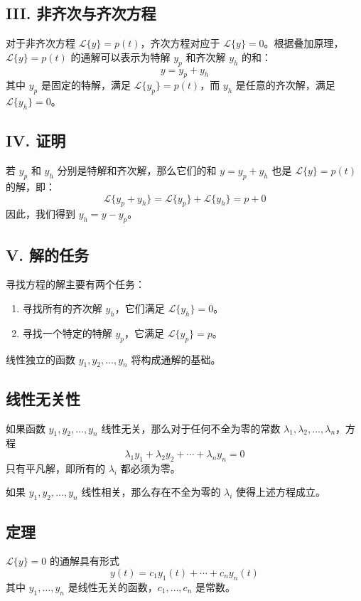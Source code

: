 \documentclass{ctexart}
\begin{document}
\subsection*{III. 非齐次与齐次方程}
对于非齐次方程 \( \mathcal{L}\{y\} = p(t) \)，齐次方程对应于 \( \mathcal{L}\{y\} = 0 \)。根据叠加原理，\( \mathcal{L}\{y\} = p(t) \) 的通解可以表示为特解 \( y_p \) 和齐次解 \( y_h \) 的和：
\[
y = y_p + y_h
\]
其中 \( y_p \) 是固定的特解，满足 \( \mathcal{L}\{y_p\} = p(t) \)，而 \( y_h \) 是任意的齐次解，满足 \( \mathcal{L}\{y_h\} = 0 \)。

\subsection*{IV. 证明}
若 \( y_p \) 和 \( y_h \) 分别是特解和齐次解，那么它们的和 \( y = y_p + y_h \) 也是 \( \mathcal{L}\{y\} = p(t) \) 的解，即：
\[
\mathcal{L}\{y_p + y_h\} = \mathcal{L}\{y_p\} + \mathcal{L}\{y_h\} = p + 0
\]
因此，我们得到 \( y_h = y - y_p \)。

\subsection*{V. 解的任务}
寻找方程的解主要有两个任务：
\begin{enumerate}
  \item 寻找所有的齐次解 \( y_h \)，它们满足 \( \mathcal{L}\{y_h\} = 0 \)。
  \item 寻找一个特定的特解 \( y_p \)，它满足 \( \mathcal{L}\{y_p\} = p \)。
\end{enumerate}
线性独立的函数 \( y_1, y_2, \ldots, y_n \) 将构成通解的基础。



\subsection*{线性无关性}
如果函数 \( y_1, y_2, \ldots, y_n \) 线性无关，那么对于任何不全为零的常数 \( \lambda_1, \lambda_2, \ldots, \lambda_n \)，方程
\[
\lambda_1 y_1 + \lambda_2 y_2 + \cdots + \lambda_n y_n = 0
\]
只有平凡解，即所有的 \( \lambda_i \) 都必须为零。

如果 \( y_1, y_2, \ldots, y_n \) 线性相关，那么存在不全为零的 \( \lambda_i \) 使得上述方程成立。

\subsection*{定理}
\( \mathcal{L}\{y\} = 0 \) 的通解具有形式
\[
y(t) = c_1 y_1(t) + \cdots + c_n y_n(t)
\]
其中 \( y_1, \ldots, y_n \) 是线性无关的函数，\( c_1, \ldots, c_n \) 是常数。
\end{document}
